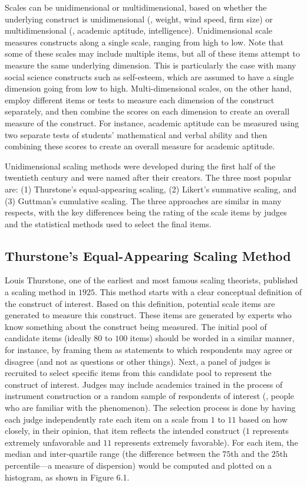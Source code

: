 Scales can be unidimensional or multidimensional, based on whether the underlying construct is unidimensional (\eg, weight, wind speed, firm size) or multidimensional (\eg, academic aptitude, intelligence). Unidimensional scale measures constructs along a single scale, ranging from high to low. Note that some of these scales may include multiple items, but all of these items attempt to measure the same underlying dimension. This is particularly the case with many social science constructs such as self-esteem, which are assumed to have a single dimension going from low to high. Multi-dimensional scales, on the other hand, employ different items or tests to measure each dimension of the construct separately, and then combine the scores on each dimension to create an overall measure of the construct. For instance, academic aptitude can be measured using two separate tests of students' mathematical and verbal ability and then combining these scores to create an overall measure for academic aptitude. 

Unidimensional scaling methods were developed during the first half of the twentieth century and were named after their creators. The three most popular are: (1) Thurstone's equal-appearing scaling, (2) Likert's summative scaling, and (3) Guttman's cumulative scaling. The three approaches are similar in many respects, with the key differences being the rating of the scale items by judges and the statistical methods used to select the final items.

\subsection{Thurstone's Equal-Appearing Scaling Method}

Louis Thurstone, one of the earliest and most famous scaling theorists, published a scaling method in $ 1925 $\cite{thurstone1925method}. This method starts with a clear conceptual definition of the construct of interest. Based on this definition, potential scale items are generated to measure this construct. These items are generated by experts who know something about the construct being measured. The initial pool of candidate items (ideally $ 80 $ to $ 100 $ items) should be worded in a similar manner, for instance, by framing them as statements to which respondents may agree or disagree (and not as questions or other things). Next, a panel of judges is recruited to select specific items from this candidate pool to represent the construct of interest. Judges may include academics trained in the process of instrument construction or a random sample of respondents of interest (\ie, people who are familiar with the phenomenon). The selection process is done by having each judge independently rate each item on a scale from $ 1 $ to $ 11 $ based on how closely, in their opinion, that item reflects the intended construct ($ 1 $ represents extremely unfavorable and $ 11 $ represents extremely favorable). For each item, the median and inter-quartile range (the difference between the $ 75 $th and the $ 25 $th percentile---a measure of dispersion) would be computed and plotted on a histogram, as shown in Figure 6.1. 


